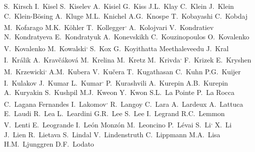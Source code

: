\begin{flushleft}
S.~Kirsch\And
I.~Kisel\And
S.~Kiselev\And
A.~Kisiel\And
G.~Kiss\And
J.L.~Klay\And
C.~Klein\And
J.~Klein\And
C.~Klein-B\"{o}sing\And
A.~Kluge\And
M.L.~Knichel\And
A.G.~Knospe\And
T.~Kobayashi\And
C.~Kobdaj\And
M.~Kofarago\And
M.K.~K\"{o}hler\And
T.~Kollegger\textsuperscript{,}\And
A.~Kolojvari\And
V.~Kondratiev\And
N.~Kondratyeva\And
E.~Kondratyuk\And
A.~Konevskikh\And
C.~Kouzinopoulos\And
O.~Kovalenko\And
V.~Kovalenko\And
M.~Kowalski\textsuperscript{,}\And
S.~Kox\And
G.~Koyithatta Meethaleveedu\And
J.~Kral\And
I.~Kr\'{a}lik\And
A.~Krav\v{c}\'{a}kov\'{a}\And
M.~Krelina\And
M.~Kretz\And
M.~Krivda\textsuperscript{,}\And
F.~Krizek\And
E.~Kryshen\And
M.~Krzewicki\textsuperscript{,}\And
A.M.~Kubera\And
V.~Ku\v{c}era\And
T.~Kugathasan\And
C.~Kuhn\And
P.G.~Kuijer\And
I.~Kulakov\And
J.~Kumar\And
L.~Kumar\textsuperscript{,}\And
P.~Kurashvili\And
A.~Kurepin\And
A.B.~Kurepin\And
A.~Kuryakin\And
S.~Kushpil\And
M.J.~Kweon\And
Y.~Kwon\And
S.L.~La Pointe\And
P.~La Rocca\And
C.~Lagana Fernandes\And
I.~Lakomov\textsuperscript{,}\And
R.~Langoy\And
C.~Lara\And
A.~Lardeux\And
A.~Lattuca\And
E.~Laudi\And
R.~Lea\And
L.~Leardini\And
G.R.~Lee\And
S.~Lee\And
I.~Legrand\And
R.C.~Lemmon\And
V.~Lenti\And
E.~Leogrande\And
I.~Le\'{o}n Monz\'{o}n\And
M.~Leoncino\And
P.~L\'{e}vai\And
S.~Li\textsuperscript{,}\And
X.~Li\And
J.~Lien\And
R.~Lietava\And
S.~Lindal\And
V.~Lindenstruth\And
C.~Lippmann\And
M.A.~Lisa\And
H.M.~Ljunggren\And
D.F.~Lodato\And

\end{flushleft}
